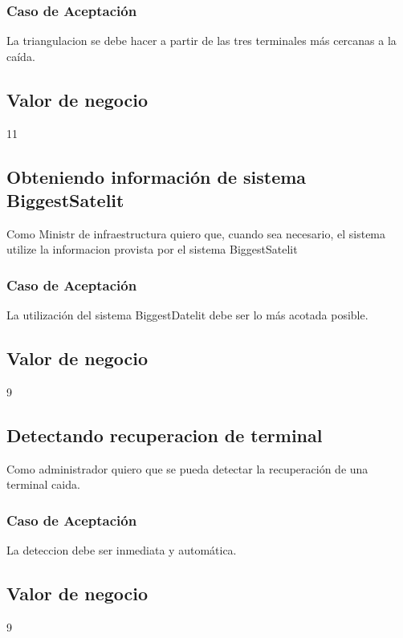 \subsubsection*{Caso de Aceptación}
La triangulacion se debe hacer a partir de las tres terminales más cercanas a la caída.
\subsection*{Valor de negocio}
11


\linea \subsection*{Obteniendo información de sistema BiggestSatelit}
Como Ministr de infraestructura quiero que, cuando sea necesario, el sistema utilize la informacion provista por el sistema BiggestSatelit
\subsubsection*{Caso de Aceptación}
La utilización del sistema BiggestDatelit debe ser lo más acotada posible.
\subsection*{Valor de negocio}
9


\linea \subsection*{Detectando recuperacion de terminal}
Como administrador quiero que se pueda detectar la recuperación de una terminal caida.
\subsubsection*{Caso de Aceptación}
La deteccion debe ser inmediata y automática.
\subsection*{Valor de negocio}
9


